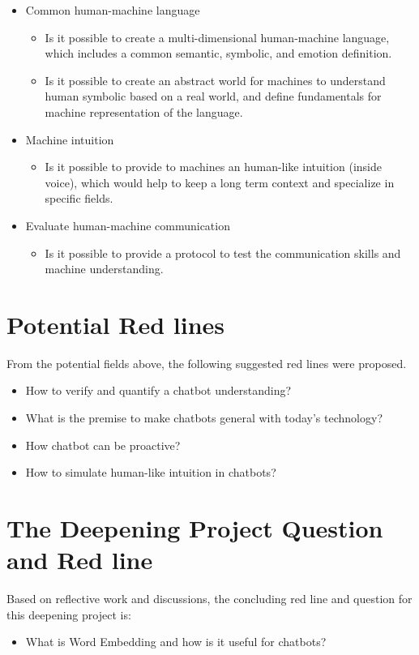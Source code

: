\begin{itemize}
    \item Common human-machine language
    \begin{itemize}[noitemsep]
        \item Is it possible to create a multi-dimensional human-machine language, which includes a common semantic, symbolic, and emotion definition.
        \item Is it possible to create an abstract world for machines to understand human symbolic based on a real world, and define fundamentals for machine representation of the language.
    \end{itemize}
    \item Machine intuition
    \begin{itemize}[noitemsep]
        \item Is it possible to provide to machines an human-like intuition (inside voice), which would help to keep a long term context and specialize in specific fields.
    \end{itemize}
    \item Evaluate human-machine communication
    \begin{itemize}[noitemsep]
        \item Is it possible to provide a protocol to test the communication skills and machine understanding.
    \end{itemize}
\end{itemize}


\section{Potential Red lines}
From the potential fields above, the following suggested red lines were proposed.

\begin{itemize}[noitemsep]
    \item How to verify and quantify a chatbot understanding?
    \item What is the premise to make chatbots general with today's technology?
    \item How chatbot can be proactive?
    \item How to simulate human-like intuition in chatbots?
\end{itemize}


\section{The Deepening Project Question and Red line}
Based on reflective work and discussions, the concluding red line and question for this deepening project is:

\begin{itemize}[noitemsep]
    \item What is Word Embedding and how is it useful for chatbots?
\end{itemize}


